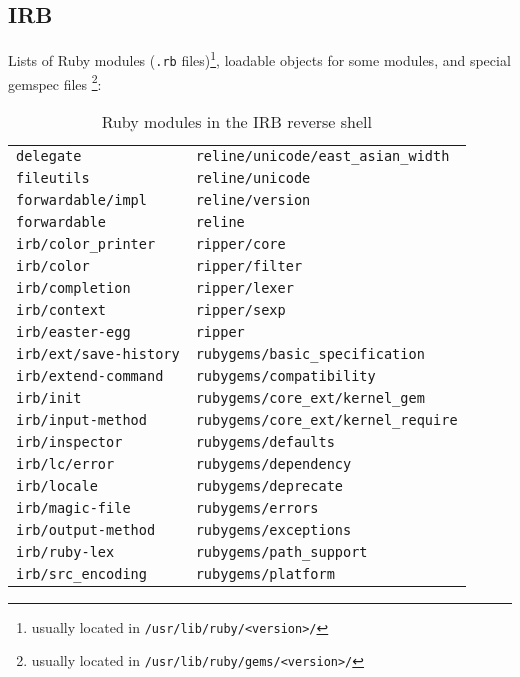 \subsection*{IRB}


Lists of Ruby modules (\texttt{.rb} files)\footnote{usually located in \texttt{/usr/lib/ruby/<version>/}}, loadable objects for some modules, and special gemspec files \footnote{usually located in \texttt{/usr/lib/ruby/gems/<version>/}}:

\begin{longtable}{l l}
\caption{Ruby modules in the IRB reverse shell}\label{tab:irb-dpd-mod} \\
\texttt{delegate} & \texttt{reline/unicode/east\_asian\_width} \\
\texttt{fileutils} & \texttt{reline/unicode} \\
\texttt{forwardable/impl} & \texttt{reline/version} \\
\texttt{forwardable} & \texttt{reline} \\
\texttt{irb/color\_printer} & \texttt{ripper/core} \\
\texttt{irb/color} & \texttt{ripper/filter} \\
\texttt{irb/completion} & \texttt{ripper/lexer} \\
\texttt{irb/context} & \texttt{ripper/sexp} \\
\texttt{irb/easter-egg} & \texttt{ripper} \\
\texttt{irb/ext/save-history} & \texttt{rubygems/basic\_specification} \\
\texttt{irb/extend-command} & \texttt{rubygems/compatibility} \\
\texttt{irb/init} & \texttt{rubygems/core\_ext/kernel\_gem} \\
\texttt{irb/input-method} & \texttt{rubygems/core\_ext/kernel\_require} \\
\texttt{irb/inspector} & \texttt{rubygems/defaults} \\
\texttt{irb/lc/error} & \texttt{rubygems/dependency} \\
\texttt{irb/locale} & \texttt{rubygems/deprecate} \\
\texttt{irb/magic-file} & \texttt{rubygems/errors} \\
\texttt{irb/output-method} & \texttt{rubygems/exceptions} \\
\texttt{irb/ruby-lex} & \texttt{rubygems/path\_support} \\
\texttt{irb/src\_encoding} & \texttt{rubygems/platform} \\

\end{longtable}
